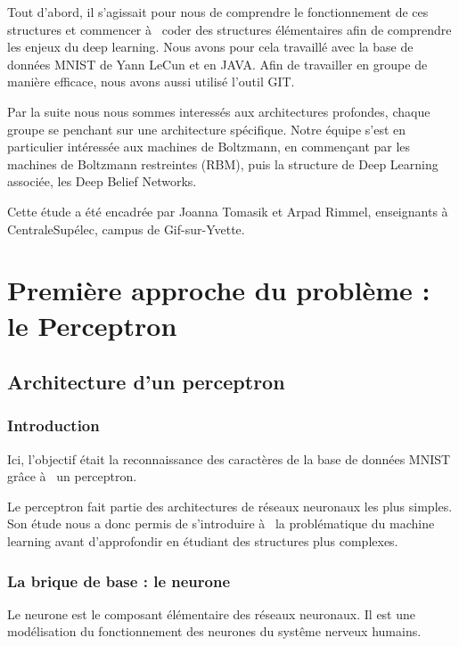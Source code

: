 \documentclass[a4paper,twoside]{report}
\begin{document}
            Tout d'abord, il s'agissait pour nous de comprendre le fonctionnement de ces structures et commencer à  coder des structures élémentaires afin de comprendre les enjeux du deep learning. Nous avons pour cela travaillé avec la base de données MNIST de Yann LeCun et en JAVA. Afin de travailler en groupe de manière efficace, nous avons aussi utilisé l'outil GIT.

            Par la suite nous nous sommes interessés aux architectures profondes, chaque groupe se penchant sur une architecture spécifique. Notre équipe s'est en particulier intéressée aux machines de Boltzmann, en commençant par les machines de Boltzmann restreintes (RBM), puis la structure de Deep Learning associée, les Deep Belief Networks.

            Cette étude a été encadrée par Joanna Tomasik et Arpad Rimmel, enseignants à  CentraleSupélec, campus de Gif-sur-Yvette.



    \part[Le Perceptron]{Première approche du problème : le Perceptron}


        \chapter{Architecture d'un perceptron}

            \section{Introduction}

                Ici, l'objectif était la reconnaissance des caractères de la base de données MNIST grâce à  un perceptron.

                Le perceptron fait partie des architectures de réseaux neuronaux les plus simples. Son étude nous a donc permis de s'introduire à  la problématique du machine learning avant d'approfondir en étudiant des structures plus complexes.


            \section{La brique de base : le neurone}

                Le neurone est le composant élémentaire des réseaux neuronaux. Il est une modélisation du fonctionnement des neurones du systême nerveux humains.
\end{document}
